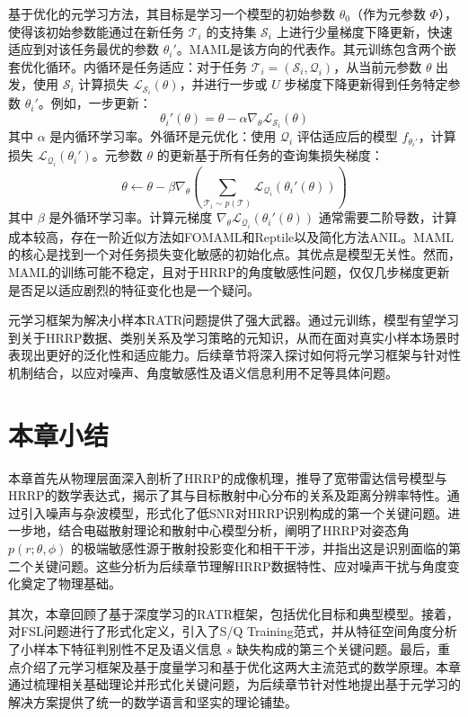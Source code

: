 基于优化的元学习方法，其目标是学习一个模型的初始参数 $\theta_0$（作为元参数 $\Phi$），使得该初始参数能通过在新任务 $\mathcal{T}_i$ 的支持集 $\mathcal{S}_i$ 上进行少量梯度下降更新，快速适应到对该任务最优的参数 $\theta_i'$。MAML是该方向的代表作。其元训练包含两个嵌套优化循环。内循环是任务适应：对于任务 $\mathcal{T}_i=(\mathcal{S}_i, \mathcal{Q}_i)$，从当前元参数 $\theta$ 出发，使用 $\mathcal{S}_i$ 计算损失 $\mathcal{L}_{\mathcal{S}_i}(\theta)$，并进行一步或 $U$ 步梯度下降更新得到任务特定参数 $\theta_i'$。例如，一步更新：
\begin{equation}
    \theta_i'(\theta) = \theta - \alpha \nabla_\theta \mathcal{L}_{\mathcal{S}_i}(\theta)
    \label{eq:maml_inner_update}
\end{equation}
其中 $\alpha$ 是内循环学习率。外循环是元优化：使用 $\mathcal{Q}_i$ 评估适应后的模型 $f_{\theta_i'}$，计算损失 $\mathcal{L}_{\mathcal{Q}_i}(\theta_i')$。元参数 $\theta$ 的更新基于所有任务的查询集损失梯度：
\begin{equation}
    \theta \leftarrow \theta - \beta \nabla_\theta \left( \sum_{\mathcal{T}_i \sim p(\mathcal{T})} \mathcal{L}_{\mathcal{Q}_i}(\theta_i'(\theta)) \right)
    \label{eq:maml_outer_update}
\end{equation}
其中 $\beta$ 是外循环学习率。计算元梯度 $\nabla_\theta \mathcal{L}_{\mathcal{Q}_i}(\theta_i'(\theta))$ 通常需要二阶导数，计算成本较高，存在一阶近似方法如FOMAML和Reptile以及简化方法ANIL。MAML的核心是找到一个对任务损失变化敏感的初始化点。其优点是模型无关性。然而，MAML的训练可能不稳定，且对于HRRP的角度敏感性问题，仅仅几步梯度更新是否足以适应剧烈的特征变化也是一个疑问。


元学习框架为解决小样本RATR问题提供了强大武器。通过元训练，模型有望学习到关于HRRP数据、类别关系及学习策略的元知识，从而在面对真实小样本场景时表现出更好的泛化性和适应能力。后续章节将深入探讨如何将元学习框架与针对性机制结合，以应对噪声、角度敏感性及语义信息利用不足等具体问题。

\section{本章小结}
\label{sec:theory_summary}
本章首先从物理层面深入剖析了HRRP的成像机理，推导了宽带雷达信号模型与HRRP的数学表达式，揭示了其与目标散射中心分布的关系及距离分辨率特性。通过引入噪声与杂波模型，形式化了低SNR对HRRP识别构成的第一个关键问题。进一步地，结合电磁散射理论和散射中心模型分析，阐明了HRRP对姿态角 $p(r; \theta, \phi)$ 的极端敏感性源于散射投影变化和相干干涉，并指出这是识别面临的第二个关键问题。这些分析为后续章节理解HRRP数据特性、应对噪声干扰与角度变化奠定了物理基础。

其次，本章回顾了基于深度学习的RATR框架，包括优化目标和典型模型。接着，对FSL问题进行了形式化定义，引入了S/Q Training范式，并从特征空间角度分析了小样本下特征判别性不足及语义信息 $s$ 缺失构成的第三个关键问题。最后，重点介绍了元学习框架及基于度量学习和基于优化这两大主流范式的数学原理。本章通过梳理相关基础理论并形式化关键问题，为后续章节针对性地提出基于元学习的解决方案提供了统一的数学语言和坚实的理论铺垫。